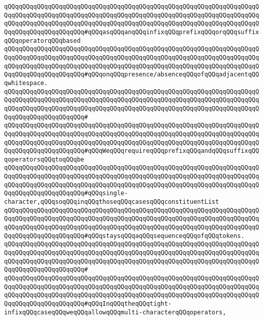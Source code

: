 \verb|qQQqqQQqqQQqqQQqqQQqqQQqqQQqqQQqqQQqqQQqqQQqqQQqqQQqqQQqqQQqqQQqqQQqqQQqqQQqqQQqqQQqqQQqqQQqqQQqqQQqqQQqqQQqqQQqqQQqqQQqqQQqqQQqqQQqqQQqqQQqqQQqqQQqqQQqqQQqqQQqqQQqqQQqqQQqqQQqqQQqqQQqqQQqqQQqqQQqqQQqqQQqqQQqqQQqqQQqqQQqqQQqqQQqqQQq#qQQqasqQQqanqQQqinfixqQQqprefixqQQqorqQQqsuffixqQQqoperatorqQQqbased|\newline
\verb|qQQqqQQqqQQqqQQqqQQqqQQqqQQqqQQqqQQqqQQqqQQqqQQqqQQqqQQqqQQqqQQqqQQqqQQqqQQqqQQqqQQqqQQqqQQqqQQqqQQqqQQqqQQqqQQqqQQqqQQqqQQqqQQqqQQqqQQqqQQqqQQqqQQqqQQqqQQqqQQqqQQqqQQqqQQqqQQqqQQqqQQqqQQqqQQqqQQqqQQqqQQqqQQqqQQqqQQqqQQqqQQqqQQqqQQq#qQQqonqQQqpresence/absenceqQQqofqQQqadjacentqQQqwhitespace.|\newline
\verb|qQQqqQQqqQQqqQQqqQQqqQQqqQQqqQQqqQQqqQQqqQQqqQQqqQQqqQQqqQQqqQQqqQQqqQQqqQQqqQQqqQQqqQQqqQQqqQQqqQQqqQQqqQQqqQQqqQQqqQQqqQQqqQQqqQQqqQQqqQQqqQQqqQQqqQQqqQQqqQQqqQQqqQQqqQQqqQQqqQQqqQQqqQQqqQQqqQQqqQQqqQQqqQQqqQQqqQQqqQQqqQQqqQQqqQQq#|\newline
\verb|qQQqqQQqqQQqqQQqqQQqqQQqqQQqqQQqqQQqqQQqqQQqqQQqqQQqqQQqqQQqqQQqqQQqqQQqqQQqqQQqqQQqqQQqqQQqqQQqqQQqqQQqqQQqqQQqqQQqqQQqqQQqqQQqqQQqqQQqqQQqqQQqqQQqqQQqqQQqqQQqqQQqqQQqqQQqqQQqqQQqqQQqqQQqqQQqqQQqqQQqqQQqqQQqqQQqqQQqqQQqqQQqqQQqqQQq#qQQqWeqQQqrequireqQQqprefixqQQqandqQQqsuffixqQQqoperatorsqQQqtoqQQqbe|\newline
\verb|qQQqqQQqqQQqqQQqqQQqqQQqqQQqqQQqqQQqqQQqqQQqqQQqqQQqqQQqqQQqqQQqqQQqqQQqqQQqqQQqqQQqqQQqqQQqqQQqqQQqqQQqqQQqqQQqqQQqqQQqqQQqqQQqqQQqqQQqqQQqqQQqqQQqqQQqqQQqqQQqqQQqqQQqqQQqqQQqqQQqqQQqqQQqqQQqqQQqqQQqqQQqqQQqqQQqqQQqqQQqqQQqqQQqqQQq#qQQqsingle-character,qQQqsoqQQqinqQQqthoseqQQqcasesqQQqconstituentList|\newline
\verb|qQQqqQQqqQQqqQQqqQQqqQQqqQQqqQQqqQQqqQQqqQQqqQQqqQQqqQQqqQQqqQQqqQQqqQQqqQQqqQQqqQQqqQQqqQQqqQQqqQQqqQQqqQQqqQQqqQQqqQQqqQQqqQQqqQQqqQQqqQQqqQQqqQQqqQQqqQQqqQQqqQQqqQQqqQQqqQQqqQQqqQQqqQQqqQQqqQQqqQQqqQQqqQQqqQQqqQQqqQQqqQQqqQQqqQQq#qQQqstaysqQQqaqQQqsequenceqQQqofqQQqtokens.|\newline
\verb|qQQqqQQqqQQqqQQqqQQqqQQqqQQqqQQqqQQqqQQqqQQqqQQqqQQqqQQqqQQqqQQqqQQqqQQqqQQqqQQqqQQqqQQqqQQqqQQqqQQqqQQqqQQqqQQqqQQqqQQqqQQqqQQqqQQqqQQqqQQqqQQqqQQqqQQqqQQqqQQqqQQqqQQqqQQqqQQqqQQqqQQqqQQqqQQqqQQqqQQqqQQqqQQqqQQqqQQqqQQqqQQqqQQqqQQq#|\newline
\verb|qQQqqQQqqQQqqQQqqQQqqQQqqQQqqQQqqQQqqQQqqQQqqQQqqQQqqQQqqQQqqQQqqQQqqQQqqQQqqQQqqQQqqQQqqQQqqQQqqQQqqQQqqQQqqQQqqQQqqQQqqQQqqQQqqQQqqQQqqQQqqQQqqQQqqQQqqQQqqQQqqQQqqQQqqQQqqQQqqQQqqQQqqQQqqQQqqQQqqQQqqQQqqQQqqQQqqQQqqQQqqQQqqQQqqQQq#qQQqInqQQqtheqQQqtight-infixqQQqcaseqQQqweqQQqallowqQQqmulti-characterqQQqoperators,|\newline
